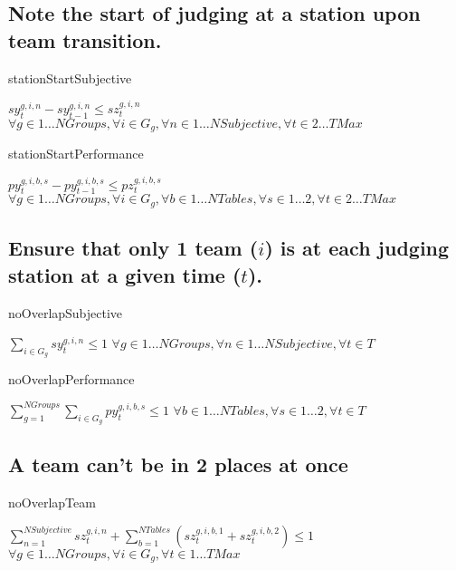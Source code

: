 \documentclass[letterpaper,11pt]{report}
\begin{document}
\FloatBarrier
\subsection{Note the start of judging at a station upon team transition.}
\begin{algorithm}
\caption{stationStartSubjective}
$sy_{t}^{g,i,n} - sy_{t-1}^{g,i,n} \le sz_{t}^{g,i,n}$
\hfill $
\forall g \in 1 \dots NGroups,
\forall i \in G_{g},
\forall n \in 1 \dots NSubjective,
\forall t \in {2 \dots TMax}
$
\end{algorithm}

\begin{algorithm}
\caption{stationStartPerformance}
$py_{t}^{g,i,b,s} - py_{t-1}^{g,i,b,s} \le pz_{t}^{g,i,b,s}$
\hfill $
\forall g \in 1 \dots NGroups,
\forall i \in G_{g},
\forall b \in {1 \dots NTables},
\forall s \in 1 \dots 2,
\forall t \in {2 \dots TMax}
$
\end{algorithm}


\FloatBarrier
\subsection{Ensure that only 1 team ($i$) is at each judging station at a
given time ($t$).}
\label{judging_group_constraint}

\begin{algorithm}
\caption{noOverlapSubjective}
$\sum\limits_{i \in G_{g}} sy_{t}^{g,i,n} \le 1$          
\hfill $
\forall g \in 1 \dots NGroups,
\forall n \in 1 \dots NSubjective,
\forall t \in T
$
\end{algorithm}

\begin{algorithm}
\caption{noOverlapPerformance}
$\sum\limits_{g=1}^{NGroups} \sum\limits_{i \in G_{g}} py_{t}^{g,i,b,s} \le 1$
\hfill $
\forall b \in 1 \dots NTables,
\forall s \in 1 \dots 2,
\forall t \in T
$
\end{algorithm}

\FloatBarrier
\subsection{A team can't be in 2 places at once}
\begin{algorithm}
\caption{noOverlapTeam}
$\sum\limits_{n=1}^{NSubjective} sz_{t}^{g,i,n}
+ \sum\limits_{b=1}^{NTables} ( sz_{t}^{g,i,b,1} + sz_{t}^{g,i,b,2} )
\le 1
$
\hfill $
\forall g \in 1 \dots NGroups,
\forall i \in G_{g},
\forall t \in 1 \dots TMax
$
\end{algorithm}
\end{document}
